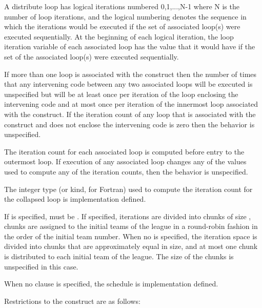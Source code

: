 A distribute loop has logical iterations numbered 0,1,...,N-1 where N
is the number of loop iterations, and the logical numbering denotes
the sequence in which the iterations would be executed if the set of
associated loop(s) were executed sequentially.  At the beginning of
each logical iteration, the loop iteration variable of each associated
loop has the value that it would have if the set of the associated
loop(s) were executed sequentially.

If more than one loop is associated with the 
construct then the number of times that any intervening code between
any two associated loops will be executed is unspecified but will be
at least once per iteration of the loop enclosing the intervening code
and at most once per iteration of the innermost loop associated with
the construct.  If the iteration count of any loop that is associated with the
 construct and does not enclose the intervening code is zero
then the behavior is unspecified.


The iteration count for each associated loop is computed before entry to the outermost loop. If execution of any associated loop changes any of the values used to compute any of the iteration counts, then the behavior is unspecified.

The integer type (or kind, for Fortran) used to compute the iteration count for the collapsed loop is implementation defined.

If  is specified,  must be . If specified, iterations are
divided into chunks of size , chunks are assigned to the
initial teams of the league in
a round-robin fashion in the order of the initial team number. When no  is specified,
the iteration space is divided into chunks that are approximately equal in size, and at
most one chunk is distributed to each initial team of the league. The size of the
chunks is unspecified in this case.

When no  clause is specified, the schedule is implementation defined.

{}

\restrictions
Restrictions to the  construct are as follows:

